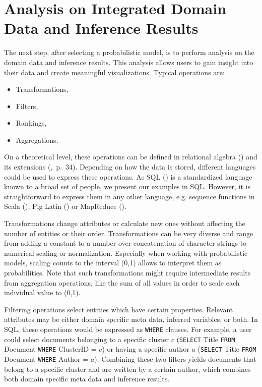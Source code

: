 \section{Analysis on Integrated Domain Data and Inference Results}

The next step, after selecting a probabilistic model, is to perform analysis on the domain data and inference results. This analysis allows users to gain insight into their data and create meaningful visualizations. Typical operations are:
\begin{itemize}
\item Transformations,
\item Filters,
\item Rankings,
\item Aggregations.
\end{itemize} On a theoretical level, these operations can be defined in relational algebra (\cite{ozsoyouglu1987extending, klug1982equivalence}) and its extensions (\cite{rajaraman2011mining},~p.~34). Depending on how the data is stored, different languages could be used to express these operations. As SQL (\cite{iso2011sql}) is a standardized language known to a broad set of people, we present our examples in SQL. However, it is straightforward to express them in any other language, e.g. sequence functions in Scala (\cite{odersky2008programming}), Pig Latin (\cite{gates2011programming}) or MapReduce (\cite{dean2008mapreduce}).

Transformations change attributes or calculate new ones without affecting the number of entities or their order. Transformations can be very diverse and range from adding a constant to a number over concatenation of character strings to numerical scaling or normalization. Especially when working with probabilistic models, scaling counts to the interval (0,1) allows to interpret them as probabilities. Note that such transformations might require intermediate results from aggregation operations, like the sum of all values in order to scale each individual value to (0,1).

Filtering operations select entities which have certain properties. Relevant attributes may be either domain specific meta data, inferred variables, or both. In SQL, these operations would be expressed as \texttt{WHERE} clauses. For example, a user could select documents belonging to a specific cluster $c$ (\texttt{SELECT} Title \texttt{FROM} Document \texttt{WHERE} ClusterID = $c$) or having a specific author $a$ (\texttt{SELECT} Title \texttt{FROM} Document \texttt{WHERE} Author = $a$). Combining these two filters yields documents that belong to a specific cluster and are written by a certain author, which combines both domain specific meta data and inference results.

